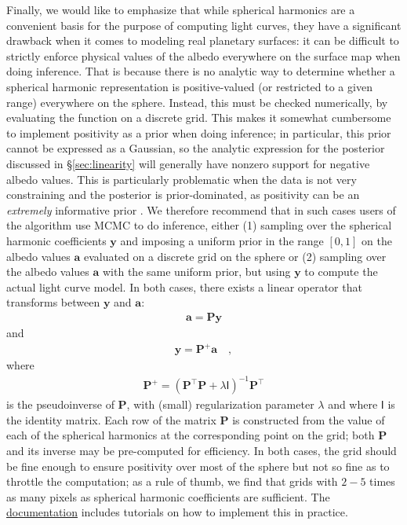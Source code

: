 \documentclass[modern]{aastex62}
\begin{document}
Finally, we would like to emphasize that while spherical harmonics are
a convenient basis for the purpose of computing light curves, they
have a significant drawback when it comes to modeling real planetary
surfaces: it can be difficult to strictly enforce physical
values of the albedo everywhere on the surface map when doing inference.
That is because there is no analytic way to determine whether a
spherical harmonic representation is positive-valued
(or restricted to a given range) everywhere on the sphere.
Instead, this must be checked numerically, by evaluating the function on a
discrete grid. This makes it somewhat cumbersome to implement positivity as a prior
when doing inference; in particular, this prior cannot be expressed as
a Gaussian, so the analytic expression for the posterior
discussed in \S\ref{sec:linearity} will generally have nonzero support for
negative albedo values. This is particularly problematic when the data is
not very constraining and the posterior is prior-dominated, as
positivity can be an \emph{extremely} informative prior
\citep[e.g.,][]{Fienup1978}.
We therefore recommend that in such cases
users of the \starry algorithm use MCMC to do inference, either
(1) sampling over the spherical
harmonic coefficients $\mathbf{y}$ and imposing a uniform prior in the range
$[0, 1]$ on the albedo values $\mathbf{a}$
evaluated on a discrete grid on the sphere or
(2) sampling over the albedo values $\mathbf{a}$ with the same uniform prior,
but using $\mathbf{y}$ to compute the actual light curve model. In both
cases, there exists a linear operator that transforms between
$\mathbf{y}$ and $\mathbf{a}$:
%
\begin{align}
    \label{eq:Py}
    \mathbf{a} = \mathbf{P} \mathbf{y}
\end{align}
%
and
%
\begin{align}
    \label{eq:PInvy}
    \mathbf{y} = \mathbf{P}^+ \mathbf{a}
    \quad,
\end{align}
%
where
%
\begin{align}
    \label{eq:PInv}
    \mathbf{P}^+ =
    (\mathbf{P}^\top \mathbf{P} + \lambda \boldsymbol{\mathsf{I}})^{-1} \mathbf{P}^\top
\end{align}
%
is the pseudoinverse of $\mathbf{P}$, with (small) regularization parameter
$\lambda$ and where $\boldsymbol{\mathsf{I}}$ is the identity matrix.
%
Each row of the matrix $\mathbf{P}$ is constructed from the value
of each of the spherical harmonics at the corresponding point on the
grid; both $\mathbf{P}$ and its inverse may be pre-computed for
efficiency. In both cases, the grid should be fine enough to ensure
positivity over most of the sphere but not so fine as to throttle the
computation; as a rule of thumb, we find that grids with $2-5$ times
as many pixels
as spherical harmonic coefficients are sufficient.
%
The \href{https://rodluger.github.io/starry}{documentation}
includes tutorials on how to implement this in practice.
\end{document}
